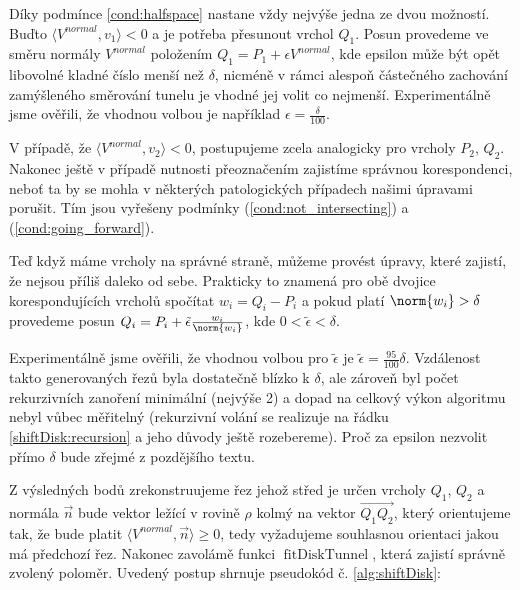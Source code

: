 Díky podmínce \ref{cond:halfspace} nastane vždy nejvýše jedna
ze dvou možností. Buďto $ \langle V^{normal}, v_1\rangle < 0 $ a je potřeba
přesunout vrchol $ Q_1 $. Posun provedeme ve směru normály $ V^{normal} $ položením
$ Q_1 = P_1 + \epsilon V^{normal} $, kde epsilon může být opět libovolné
kladné číslo menší než $ \delta $, nicméně v rámci alespoň částečného zachování
zamýšleného směrování tunelu je vhodné jej volit co nejmenší. Experimentálně
jsme ověřili, že vhodnou volbou je například $ \epsilon = \frac{\delta}{100} $.

V případě, že $ \langle V^{normal}, v_2\rangle < 0 $, postupujeme zcela analogicky
pro vrcholy $ P_2 $, $ Q_2 $. Nakonec ještě v případě nutnosti přeoznačením
zajistíme správnou korespondenci, neboť ta by se mohla v některých patologických
případech našimi úpravami porušit. Tím jsou vyřešeny podmínky
(\ref{cond:not_intersecting}) a (\ref{cond:going_forward}).

Teď když máme vrcholy na správné straně, můžeme provést úpravy, které zajistí,
že nejsou příliš daleko od sebe. Prakticky to znamená pro obě dvojice
korespondujících vrcholů spočítat $ w_i = Q_i - P_i $ a pokud platí
$ \norm{w_i} > \delta $ provedeme posun
$ Q_i = P_i + \tilde{\epsilon} \frac{w_i}{\norm{w_i}} $, kde
$ 0 < \tilde{\epsilon} < \delta $.

Experimentálně jsme ověřili, že vhodnou volbou pro $ \tilde{\epsilon} $ je
$ \tilde{\epsilon} = \frac{95}{100} \delta$. Vzdálenost takto generovaných řezů
byla dostatečně blízko k $ \delta $, ale zároveň byl počet rekurzivních zanoření
minimální (nejvýše 2) a dopad na celkový výkon algoritmu nebyl vůbec měřitelný
(rekurzivní volání se realizuje na řádku \ref{shiftDisk:recursion} a jeho důvody
ještě rozebereme). Proč za epsilon nezvolit přímo $ \delta $ bude zřejmé z
pozdějšího textu.

Z výsledných bodů zrekonstruujeme řez jehož střed je určen vrcholy
$ Q_1 $, $ Q_2 $ a normála $ \vec{n} $ bude vektor ležící v rovině $ \rho $
kolmý na vektor $ \overrightarrow{Q_1 Q_2} $, který orientujeme tak, že bude platit
$ \langle V^{normal}, \vec{n} \rangle \geq 0 $, tedy vyžadujeme souhlasnou
orientaci jakou má předchozí řez. Nakonec zavolámě funkci
$ \operatorname{fitDiskTunnel} $, která zajistí správně zvolený poloměr.
Uvedený postup shrnuje pseudokód č. \ref{alg:shiftDisk}:


